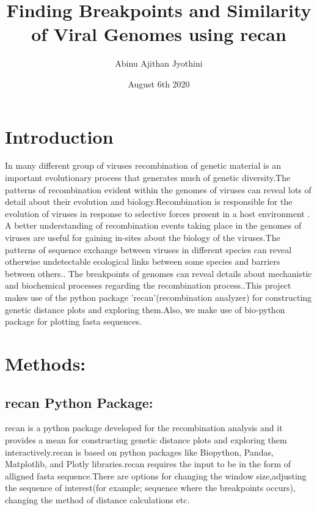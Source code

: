 \documentclass{article}
\title{Finding Breakpoints and Similarity of Viral Genomes using recan}
\author{Abinu Ajithan Jyothini}
\date{August 6th 2020}
\begin{document}
\maketitle
\section{Introduction}
In many different group of viruses recombination of genetic material is an important evolutionary process that generates much of genetic diversity.The patterns of recombination evident within the genomes of viruses can reveal lots of detail about their evolution and biology.Recombination is responsible for the evolution of viruses in response to selective forces present in a host environment \cite{perez2015recombination}. A better understanding of recombination events taking place in the genomes of viruses are useful for gaining in-sites about the biology of the viruses.The patterns of sequence exchange between viruses in different species can reveal otherwise undetectable ecological links between some species and barriers between others.\cite{martin2015rdp4}. The breakpoints of genomes can reveal details about mechanistic and biochemical processes regarding the recombination process.\cite{martin2015rdp4}.This project makes use of the python package 'recan'\cite{babin2020recan}(recombination analyzer) for constructing genetic distance plots and exploring them.Also, we make use of bio-python\cite{chapman2000biopython} package for plotting fasta sequences.
\section{Methods:}
\subsection{recan Python Package:}
recan is a python package developed for the recombination analysis and it provides a mean for constructing genetic distance plots and exploring them interactively.recan is based on python packages like Biopython, Pandas, Matplotlib, and Plotly libraries.recan requires the input to be in the form of alligned fasta sequence.There are options for changing the window size,adjusting the sequence of interest(for example; sequence where the breakpoints occurs), changing the method of distance calculations etc.
\end{document}
